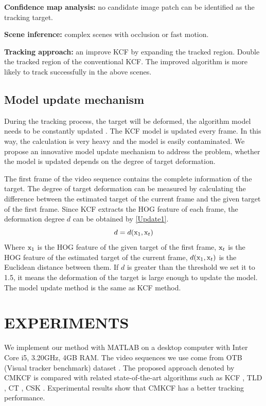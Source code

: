 \documentclass[conference]{IEEEtran}
\begin{document}
\noindent
{\bfseries Confidence map analysis:} no candidate image patch can be identified as the tracking target.

\noindent
{\bfseries Scene inference:} complex scenes with occlusion or fast motion.

\noindent
{\bfseries Tracking approach:} an improve KCF by expanding the tracked region.
Double the tracked region of the conventional KCF.
The improved algorithm is more likely to track successfully in the above scenes.


\subsection{Model update mechanism}
During the tracking process, the target will be deformed, the algorithm model needs to be constantly updated \cite{Modelupdate}.
The KCF model is updated every frame.
In this way, the calculation is very heavy and the model is easily contaminated.
We propose an innovative model update mechanism to address the problem, whether the model is updated depends on the degree of target deformation.

The first frame of the video sequence contains the complete information of the target.
The degree of target deformation can be measured by calculating the difference between the estimated target of the current frame and the given target of the first frame.
Since KCF extracts the HOG feature of each frame, the deformation degree $d$ can be obtained by \eqref{Update1}.
\begin{equation}
	d=d({\rm x}_1,{\rm x}_t)
	\label{Update1}
\end{equation}
Where ${\rm x}_1$ is the HOG feature of the given target of the first frame, ${\rm x}_t$ is the HOG feature of the estimated target of the current frame, $d({\rm x}_1,{\rm x}_t)$ is the Euclidean distance between them. 
If $d$ is greater than the threshold we set it to 1.5, it means the deformation of the target is large enough to update the model.
The model update method is the same as KCF method.

\section{EXPERIMENTS}

We implement our method with MATLAB on a desktop computer with Inter Core i5, 3.20GHz, 4GB RAM. 
The video sequences we use come from OTB (Visual tracker benchmark) dataset \cite{OTB}.
The proposed approach denoted by CMKCF is compared with related state-of-the-art algorithms such as KCF \cite{KCF}, TLD \cite{TLD}, CT \cite{CT}, CSK \cite{CSK}.
Experimental results show that CMKCF has a better tracking performance.
\end{document}
